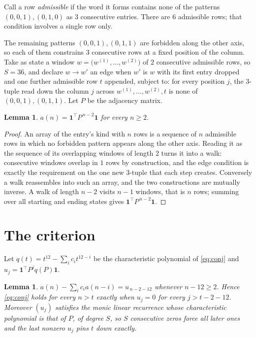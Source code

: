 \documentclass[11pt,a4paper]{article}
\theoremstyle{plain}
\newtheorem{lemma}[theorem]{Lemma}
\theoremstyle{definition}
\begin{document}
Call a row \emph{admissible} if the word it forms contains none of the patterns
$(0,0,1), (0,1,0)$ as $3$ consecutive entries. There are $6$ admissible rows; that condition
involves a single row only.

The remaining patterns $(0,0,1), (0,1,1)$ are forbidden along the other axis, so each of them
constrains $3$ consecutive rows at a fixed position of the column. Take as state a
window $w=\bigl(w^{(1)},\dots,w^{(2)}\bigr)$ of $2$ consecutive admissible
rows, so $S=36$, and declare $w\to w'$ an edge when $w'$ is $w$ with its first entry
dropped and one further admissible row $t$ appended, subject to: for every position
$j$, the $3$-tuple read down the column $j$ across $w^{(1)},\dots,w^{(2)},t$
is none of $(0,0,1), (0,1,1)$. Let $P$ be the adjacency matrix.

\begin{lemma}\label{lem:walk}
$a(n)=\mathbf{1}^{\!\top}P^{\,n-2}\mathbf{1}$ for every $n\ge2$.
\end{lemma}

\begin{proof}
An array of the entry's kind with $n$ rows is a sequence of $n$ admissible rows in
which no forbidden pattern appears along the other axis. Reading it as the sequence of its
overlapping windows of length $2$ turns it into a walk: consecutive windows overlap in
$1$ rows by construction, and the edge condition is exactly the requirement on the one
new $3$-tuple that each step creates. Conversely a walk reassembles into such an array,
and the two constructions are mutually inverse. A walk of length $n-2$ visits $n-1$
windows, that is $n$ rows; summing over all starting and ending states gives
$\mathbf{1}^{\!\top}P^{\,n-2}\mathbf{1}$.
\end{proof}

\section{The criterion}

Let $q(t)=t^{12}-\sum_i c_i t^{12-i}$ be the characteristic polynomial of
\eqref{eq:conj} and $u_j=\mathbf{1}^{\!\top}P^{j}q(P)\mathbf{1}$.

\begin{lemma}\label{lem:crit}
$a(n)-\sum_i c_i a(n-i)=u_{\,n-2-12}$ whenever $n-12\ge2$. Hence
\eqref{eq:conj} holds for every $n>t$ exactly when $u_j=0$ for every
$j>t-2-12$. Moreover $(u_j)$ satisfies the monic linear recurrence whose
characteristic polynomial is that of $P$, of degree $S$, so $S$ consecutive zeros force all
later ones and the last nonzero $u_j$ pins $t$ down exactly.
\end{lemma}
\end{document}
